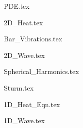 \documentclass[a4paper, 12pt]{report}
\begin{document}
\begin{center}
\begin{comment}
Start Level: Chapter
End Level: Chapter
Aditional Comments:
\end{comment}
{PDE.tex}
\begin{comment}
Start Level: Chapter
End Level: Chapter
Aditional Comments:
\end{comment}
{2D_Heat.tex}
\begin{comment}
Start Level: Chapter
End Level: Chapter
Aditional Comments:
\end{comment}
{Bar_Vibrations.tex}
\begin{comment}
Start Level: Chapter
End Level: Chapter
Aditional Comments:
\end{comment}
{2D_Wave.tex}
\begin{comment}
Start Level: Chapter
End Level: Chapter
Aditional Comments:
\end{comment}
{Spherical_Harmonics.tex}
\begin{comment}
Start Level: Chapter
End Level: Chapter
Aditional Comments:
\end{comment}
{Sturm.tex}
\begin{comment}
Start Level: Chapter
End Level: Chapter
Aditional Comments:
\end{comment}
{1D_Heat_Eqn.tex}
\begin{comment}
Start Level: Chapter
End Level: Chapter
Aditional Comments:
\end{comment}
{1D_Wave.tex}
\end{center}
\end{document}
